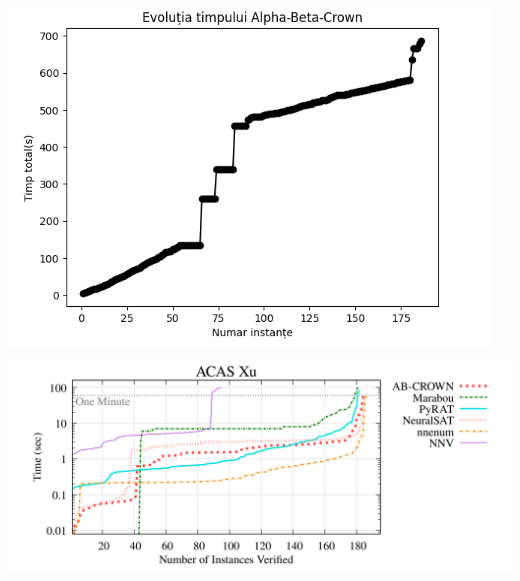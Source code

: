 \documentclass{beamer}
\begin{document}
\begin{frame}
\begin{center}
\includegraphics[scale=0.4]{timp_ab.png}
\includegraphics[scale=0.4]{vnncomp.png}
\end{center}
\end{frame}
\end{document}
